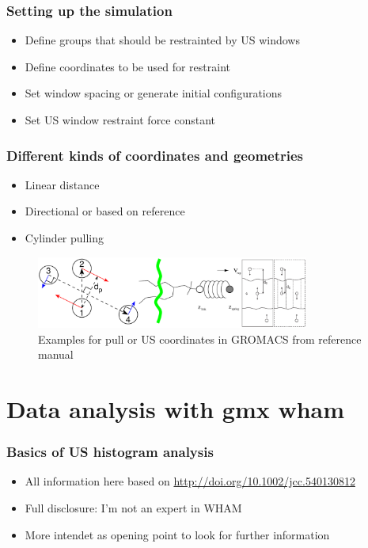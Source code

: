 \documentclass{beamer}
\numberwithin{table}{section}
\numberwithin{figure}{section}
\numberwithin{equation}{section}
\begin{document}
\begin{frame}
\frametitle{Setting up the simulation}
    \begin{itemize}
        \item{Define groups that should be restrainted by US windows}
        \item{Define coordinates to be used for restraint}
        \item{Set window spacing or generate initial configurations}
        \item{Set US window restraint force constant}
    \end{itemize}
\end{frame}

\begin{frame}
\frametitle{Different kinds of coordinates and geometries}
    \begin{itemize}
        \item{Linear distance}
        \item{Directional or based on reference}
        \item{Cylinder pulling}
    \end{itemize}
    \begin{figure}[htb]
        \centering
        \includegraphics[keepaspectratio=true, width=0.8\textwidth]{figures/pull-coordinates.pdf}
        \caption{Examples for pull or US coordinates in GROMACS from reference manual}
    \end{figure}
\end{frame}

\section{Data analysis with gmx wham}

\begin{frame}
\frametitle{Basics of US histogram analysis}
    \begin{itemize}
        \item{All information here based on \url{http://doi.org/10.1002/jcc.540130812}}
        \item{Full disclosure: I'm not an expert in WHAM}
        \item{More intendet as opening point to look for further information}
    \end{itemize}
\end{frame}
\end{document}
